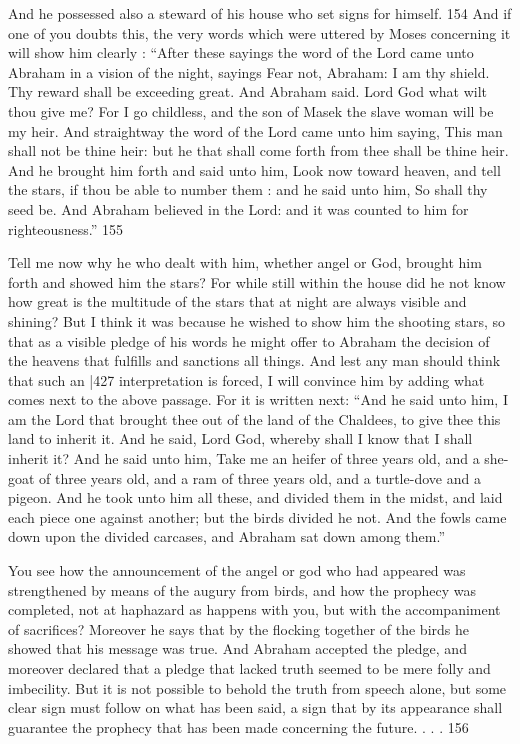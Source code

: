 And he possessed also a steward of his house who set signs for himself. 154 And if one of you doubts this, the very words which were uttered by Moses concerning it will show him clearly : ``After these sayings the word of the Lord came unto Abraham in a vision of the night, sayings Fear not, Abraham: I am thy shield. Thy reward shall be exceeding great. And Abraham said. Lord God what wilt thou give me? For I go childless, and the son of Masek the slave woman will be my heir. And straightway the word of the Lord came unto him saying, This man shall not be thine heir: but he that shall come forth from thee shall be thine heir. And he brought him forth and said unto him, Look now toward heaven, and tell the stars, if thou be able to number them : and he said unto him, So shall thy seed be. And Abraham believed in the Lord: and it was counted to him for righteousness.''
155

Tell me now why he who dealt with him, whether angel or God, brought him forth and showed him the stars? For while still within the house did he not know how great is the multitude of the stars that at night are always visible and shining? But I think it was because he wished to show him the shooting stars, so that as a visible pledge of his words he might offer to Abraham the decision of the heavens that fulfills and sanctions all things. And lest any man should think that such an
|427 interpretation is forced, I will convince him by adding what comes next to the above passage. For it is written next: ``And he said unto him, I am the Lord that brought thee out of the land of the Chaldees, to give thee this land to inherit it. And he said, Lord God, whereby shall I know that I shall inherit it? And he said unto him, Take me an heifer of three years old, and a she-goat of three years old, and a ram of three years old, and a turtle-dove and a pigeon. And he took unto him all these, and divided them in the midst, and laid each piece one against another; but the birds divided he not. And the fowls came down upon the divided carcases, and Abraham sat down among them.''

You see how the announcement of the angel or god who had appeared was strengthened by means of the augury from birds, and how the prophecy was completed, not at haphazard as happens with you, but with the accompaniment of sacrifices? Moreover he says that by the flocking together of the birds he showed that his message was true. And Abraham accepted the pledge, and moreover declared that a pledge that lacked truth seemed to be mere folly and imbecility. But it is not possible to behold the truth from speech alone, but some clear sign must follow on what has been said, a sign that by its appearance shall guarantee the prophecy that has been made concerning the future. . . . 156

